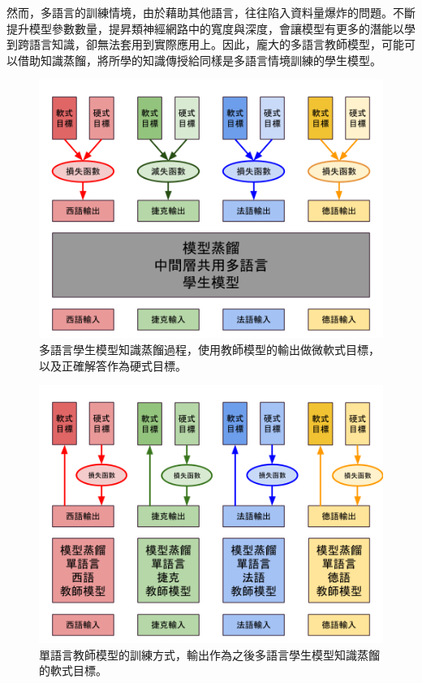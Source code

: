 然而，多語言的訓練情境，由於藉助其他語言，往往陷入資料量爆炸的問題。不斷提升模型參數數量，提昇類神經網路中的寬度與深度，會讓模型有更多的潛能以學到跨語言知識，卻無法套用到實際應用上。因此，龐大的多語言教師模型，可能可以借助知識蒸餾，將所學的知識傳授給同樣是多語言情境訓練的學生模型。
\begin{figure}[!ht]
\centering
\includegraphics[scale=0.35]{images/chap5_multilingual_distillation.png}
\caption{多語言學生模型知識蒸餾過程，使用教師模型的輸出做微軟式目標，以及正確解答作為硬式目標。}
\label{fig:chap5_multilingual_distillation}
\end{figure}
\begin{figure}[!ht]
\centering
\includegraphics[scale=0.35]{images/chap5_monolingual_cumbersome.png}
\caption{單語言教師模型的訓練方式，輸出作為之後多語言學生模型知識蒸餾的軟式目標。}
\label{fig:chap5_monolingual_cumbersome}
\end{figure}

